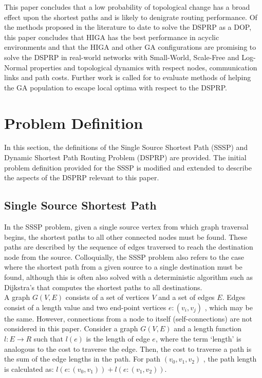 \documentclass[
	a4paper, %
	10pt, %
	unnumberedsections, %
	twoside, %
]{LTJournalArticle}
\begin{document}
This paper concludes that a low probability of topological change has a broad effect upon the  shortest paths and is likely to denigrate routing performance. Of the methods proposed in the literature to date to solve the DSPRP as a DOP, this paper concludes that HIGA has the best performance in acyclic environments and that the HIGA and other GA configurations are promising to solve the DSPRP in real-world networks with Small-World, Scale-Free and Log-Normal properties and topological dynamics with respect nodes, communication links and path costs. Further work is called for to evaluate methods of helping the GA population to escape local optima with respect to the DSPRP. \\ 


\section{Problem Definition}

In this section, the definitions of the Single Source Shortest Path (SSSP) and Dynamic Shortest Path Routing Problem (DSPRP) are provided. The initial problem definition provided for the SSSP is modified and extended to describe the aspects of the DSPRP relevant to this paper. \\

\subsection{Single Source Shortest Path}

In the SSSP problem, given a single source vertex from which graph traversal begins, the shortest paths to all other connected nodes must be found. These paths are described by the sequence of edges traversed to reach the destination node from the source. Colloquially, the SSSP problem also refers to the case where the shortest path from a given source to a single destination must be found, although this is often also solved with a deterministic algorithm such as Dijkstra's that computes the shortest paths to all destinations.\\

A graph \(G(V, E)\) consists of a set of vertices \( V \) and a set of edges \( E \). Edges consist of a length value and two end-point vertices \( e: (v_{i}, v_{j}) \) , which may be the same. However, connections from a node to itself (self-connections) are not considered in this paper. Consider a graph \( G(V, E) \) and a length function \( l: E \rightarrow R \) such that \(l(e)\) is the length of edge \(e\), where the term `length' is analogous to the cost to traverse the edge. Then, the cost to traverse a path is the sum of the edge lengths in the path. For path \( (v_{0}, v_{1}, v_{2}) \) , the path length is calculated as: \( l(e: (v_{0}, v_{1})) + l(e: (v_{1}, v_{2})) \). \\
\end{document}
